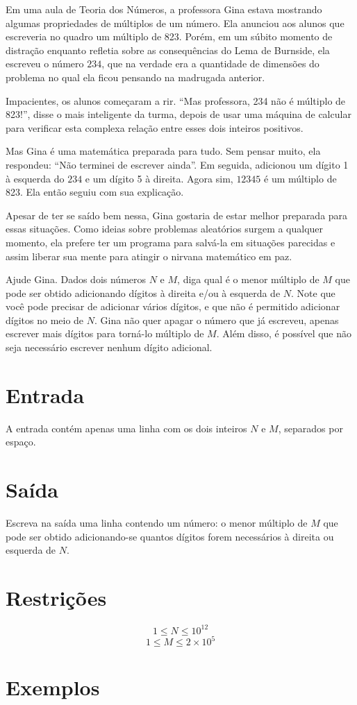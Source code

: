 Em uma aula de Teoria dos Números, a professora Gina estava mostrando algumas propriedades
de múltiplos de um número. Ela anunciou aos alunos que escreveria no quadro um múltiplo de 823.
Porém, em um súbito momento de distração enquanto refletia sobre as consequências do Lema de Burnside,
ela escreveu o número $234$, que na verdade era a quantidade de dimensões do problema no qual
ela ficou pensando na madrugada anterior.

Impacientes, os alunos começaram a rir. ``Mas professora, 234 não é múltiplo de 823!'', disse
o mais inteligente da turma, depois de usar uma máquina de calcular para verificar esta
complexa relação entre esses dois inteiros positivos.

Mas Gina é uma matemática preparada para tudo. Sem pensar muito, ela respondeu:
``Não terminei de escrever ainda''. Em seguida, adicionou um dígito 1 à esquerda do $234$ e um dígito
5 à direita. Agora sim, $12345$ é um múltiplo de 823. Ela então seguiu com sua explicação.

Apesar de ter se saído bem nessa, Gina gostaria de estar melhor preparada para essas situações.
Como ideias sobre problemas aleatórios surgem a qualquer momento, ela prefere ter um programa
para salvá-la em situações parecidas e assim liberar sua mente para atingir o nirvana matemático em paz.

Ajude Gina. Dados dois números $N$ e $M$, diga qual é o menor múltiplo de $M$ que pode ser obtido
adicionando dígitos à direita e/ou à esquerda de $N$. Note que você pode precisar de adicionar
vários dígitos, e que não é permitido adicionar dígitos no meio de $N$. Gina não quer apagar
o número que já escreveu, apenas escrever mais dígitos para torná-lo múltiplo de $M$.
Além disso, é possível que não seja necessário escrever nenhum dígito adicional.

\section*{Entrada}

A entrada contém apenas uma linha com os dois inteiros $N$ e $M$, separados por espaço.

\section*{Saída}

Escreva na saída uma linha contendo um número: o menor múltiplo de $M$ que pode
ser obtido adicionando-se quantos dígitos forem necessários à direita ou esquerda de $N$.

\section*{Restrições}

$$1 \leq N \leq 10^{12}$$
$$1 \leq M \leq 2 \times 10^5$$

\section*{Exemplos}
\exemplo
